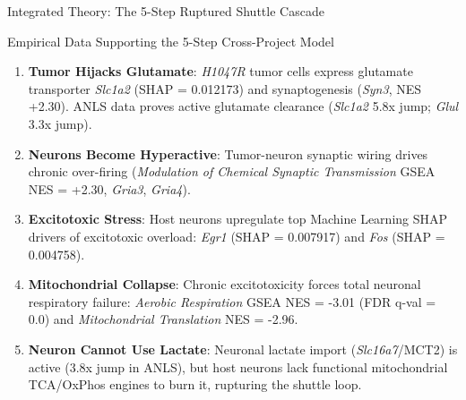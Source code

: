 \documentclass[10pt, aspectratio=169]{beamer}
\begin{document}
\begin{frame}{Integrated Theory: The 5-Step Ruptured Shuttle Cascade}
  \begin{block}{Empirical Data Supporting the 5-Step Cross-Project Model}
    \begin{enumerate}
      \item \textbf{Tumor Hijacks Glutamate}: \emph{H1047R} tumor cells express glutamate transporter \emph{Slc1a2} (SHAP = 0.012173) and synaptogenesis (\emph{Syn3}, NES +2.30). ANLS data proves active glutamate clearance (\emph{Slc1a2} 5.8x jump; \emph{Glul} 3.3x jump).
      \item \textbf{Neurons Become Hyperactive}: Tumor-neuron synaptic wiring drives chronic over-firing (\emph{Modulation of Chemical Synaptic Transmission} GSEA NES = +2.30, \emph{Gria3}, \emph{Gria4}).
      \item \textbf{Excitotoxic Stress}: Host neurons upregulate top Machine Learning SHAP drivers of excitotoxic overload: \emph{Egr1} (SHAP = 0.007917) and \emph{Fos} (SHAP = 0.004758).
      \item \textbf{Mitochondrial Collapse}: Chronic excitotoxicity forces total neuronal respiratory failure: \emph{Aerobic Respiration} GSEA NES = -3.01 (FDR q-val = 0.0) and \emph{Mitochondrial Translation} NES = -2.96.
      \item \textbf{Neuron Cannot Use Lactate}: Neuronal lactate import (\emph{Slc16a7}/MCT2) is active (3.8x jump in ANLS), but host neurons lack functional mitochondrial TCA/OxPhos engines to burn it, rupturing the shuttle loop.
    \end{enumerate}
  \end{block}
\end{frame}
\end{document}
